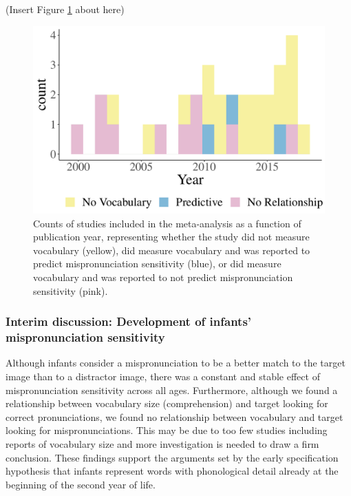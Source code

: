 \documentclass[
  english,
  man, noextraspace]{apa6}
\begin{document}
(Insert Figure \ref{fig:Vocabdescribe1} about here)

\begin{figure}
\centering
\includegraphics{VonHolzenBergmann_MPMetaAnalysis_files/figure-latex/Vocabdescribe1-1.pdf}
\caption{\label{fig:Vocabdescribe1}Counts of studies included in the meta-analysis as a function of publication year, representing whether the study did not measure vocabulary (yellow), did measure vocabulary and was reported to predict mispronunciation sensitivity (blue), or did measure vocabulary and was reported to not predict mispronunciation sensitivity (pink).}
\end{figure}

\hypertarget{interim-discussion-development-of-infants-mispronunciation-sensitivity}{%
\subsubsection{Interim discussion: Development of infants' mispronunciation sensitivity}\label{interim-discussion-development-of-infants-mispronunciation-sensitivity}}

Although infants consider a mispronunciation to be a better match to the target image than to a distractor image, there was a constant and stable effect of mispronunciation sensitivity across all ages. Furthermore, although we found a relationship between vocabulary size (comprehension) and target looking for correct pronunciations, we found no relationship between vocabulary and target looking for mispronunciations. This may be due to too few studies including reports of vocabulary size and more investigation is needed to draw a firm conclusion. These findings support the arguments set by the early specification hypothesis that infants represent words with phonological detail already at the beginning of the second year of life.
\end{document}
